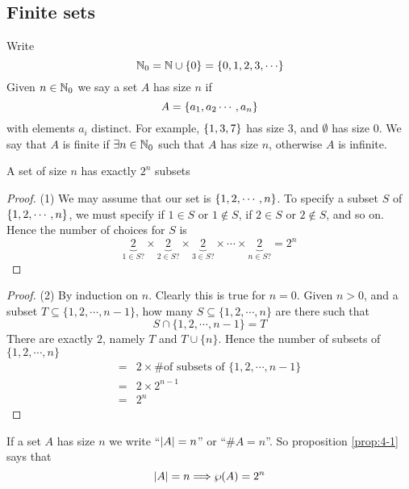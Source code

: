 \documentclass{article}
\begin{document}
\subsection{Finite sets}
Write
\[
    \N_0 = \N \cup \crbkt{0} = \crbkt{0, 1, 2, 3, \cdots}
\]
Given $n \in \mathbb{N}_0$ we say a set $A$ has size $n$ if
\[
    A = \left\{ a_1, a_2 \cdots, a_n \right\}
\]
with elements $a_i$ distinct.
For example, $\left\{ 1, 3, 7 \right\}$ has  size $3$, and $\emptyset$ has size $0$.
We say that $A$ is finite if $\exists n \in \mathbb{N}_0$ such that $A$ has size $n$,
otherwise $A$ is infinite.

\begin{nprop}\label{prop:4-1}
    A set of size $n$ has exactly $2^n$ subsets
\end{nprop}
\begin{proof} (1)
    We may assume that our set is $\left\{ 1, 2, \cdots, n \right\}$.
    To specify a subset $S$ of $\left\{ 1, 2, \cdots, n \right\}$, we must specify if $1 \in S$ or $1 \notin S$,
    if $2 \in S$ or $2 \notin S$, and so on. 
    Hence the number of choices for $S$ is
    \[
        \underbrace{2}_{1 \in S ?} \times\underbrace{2}_{2 \in S ?} \times \underbrace{2}_{3 \in S ?} \times \cdots \times \underbrace{2}_{n \in S ?} =2^n 
    \]
\end{proof}

\begin{proof} (2)
    By induction on $n$. Clearly this is true for $n = 0$.
    Given $n > 0$, and a subset $T \subseteq \{1, 2, \cdots, n-1\}$,
    how many $S \subseteq \{1, 2, \cdots, n\}$ are there such that
    \[
        S \cap \{1, 2, \cdots, n-1\} = T  
    \]
    There are exactly $2$, namely $T$ and $T \cup \{n\}$.
    Hence the number of subsets of $\{1, 2, \cdots, n\}$
    \begin{align*}
        =& 2 \times \text{\# of subsets of } \{1, 2, \cdots, n-1\} \\
        =& 2 \times 2^{n-1} \tag{by inductive hypothesis}\\
        =& 2^n
    \end{align*}
\end{proof}

If a set $A$ has size $n$ we write ``$\left\lvert A\right\rvert = n$'' or ``$\#A = n$''. 
So proposition \ref{prop:4-1} says that
\[
    \left\lvert A\right\rvert = n \Longrightarrow \wp(A) = 2^n
\]
\end{document}
